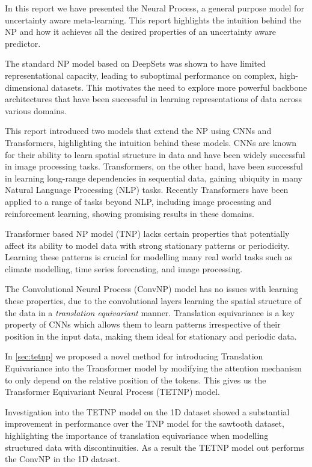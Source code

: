\documentclass[../../main.tex]{subfiles}
\begin{document}
In this report we have presented the Neural Process, a general purpose model for uncertainty aware meta-learning. This report highlights the intuition behind the NP and how it achieves all the desired properties of an uncertainty aware predictor. 

The standard NP model based on DeepSets was shown to have limited representational capacity, leading to suboptimal performance on complex, high-dimensional datasets. This motivates the need to explore more powerful backbone architectures that have been successful in learning representations of data across various domains. 

This report introduced two models that extend the NP using CNNs and Transformers, highlighting the intuition behind these models. CNNs are known for their ability to learn spatial structure in data and have been widely successful in image processing tasks. Transformers, on the other hand, have been successful in learning long-range dependencies in sequential data, gaining ubiquity in many Natural Language Processing (NLP) tasks. Recently Transformers have been applied to a range of tasks beyond NLP, including image processing and reinforcement learning, showing promising results in these domains. 

Transformer based NP model (TNP) lacks certain properties that potentially affect its ability to model data with strong stationary patterns or periodicity. Learning these patterns is crucial for modelling many real world tasks such as climate modelling, time series forecasting, and image processing. 

The Convolutional Neural Process (ConvNP) model has no issues with learning these properties, due to the convolutional layers learning the spatial structure of the data in a \emph{translation equivariant} manner. Translation equivariance is a key property of CNNs which allows them to learn patterns irrespective of their position in the input data, making them ideal for stationary and periodic data.

In \autoref{sec:tetnp}  we proposed a novel method for introducing Translation Equivariance into the Transformer model by modifying the attention mechanism to only depend on the relative position of the tokens. This gives us the Transformer Equivariant Neural Process (TETNP) model.

Investigation into the TETNP model on the 1D dataset showed a substantial improvement in performance over the TNP model for the sawtooth dataset, highlighting the importance of translation equivariance when modelling structured data with discontinuities. As a result the TETNP model out performs the ConvNP in the 1D dataset.
\end{document}
